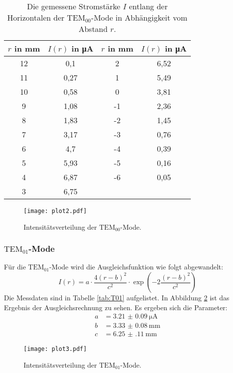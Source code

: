  \begin{table}
 	\centering
 	\caption{Die gemessene Stromstärke $I$ entlang der Horizontalen der $\text{TEM}_{\text{00}}$-Mode in Abhängigkeit vom Abstand $r$.}
 	\label{tab:T00}
  \begin{tabular}{c c c c}
    \toprule
    $r$ in mm & $I(r)$ in \si{\micro\ampere} & $r$ in mm & $I(r)$ in \si{\micro\ampere} \\
    \midrule
    12 & 0,1  & 2  & 6,52 \\
    11 & 0,27 & 1  & 5,49 \\
    10 & 0,58 & 0  & 3,81 \\
     9 & 1,08 & -1 & 2,36 \\
     8 & 1,83 & -2 & 1,45 \\
     7 & 3,17 & -3 & 0,76 \\
     6 & 4,7  & -4 & 0,39 \\
     5 & 5,93 & -5 & 0,16 \\
     4 & 6,87 & -6 & 0,05 \\
     3 & 6,75 & & \\
    \bottomrule
  \end{tabular}
 \end{table}

\begin{figure}
  \centering
  \texttt{[image: plot2.pdf]}
  \caption{Intensitätsverteilung der $\text{TEM}_{00}$-Mode.}
  \label{fig:T00}
\end{figure}

\subsubsection{$\text{TEM}_{01}$-Mode}

Für die $\text{TEM}_{01}$-Mode wird die Ausgleichsfunktion wie folgt abgewandelt:
\begin{equation}
  I(r) = a \cdot \frac{4(r-b)^2}{c^2} \cdot \exp\left(-2\frac{(r-b)^2}{c^2}\right)
\end{equation}
Die Messdaten sind in Tabelle \ref{tab:T01} aufgelistet.
In Abbildung \ref{fig:T01} ist das Ergebnis der Ausgleichsrechnung zu sehen.
Es ergeben sich die Parameter:
\begin{align*}
a &= \SI{3.21(9)}{\micro\ampere}\\
b &= \SI{3.33(8)}{\milli\metre}\\
c &= \SI{6.25(11)}{\milli\metre}
\end{align*}

\begin{figure}
  \centering
  \texttt{[image: plot3.pdf]}
  \caption{Intensitätsverteilung der $\text{TEM}_{01}$-Mode.}
  \label{fig:T01}
\end{figure}

